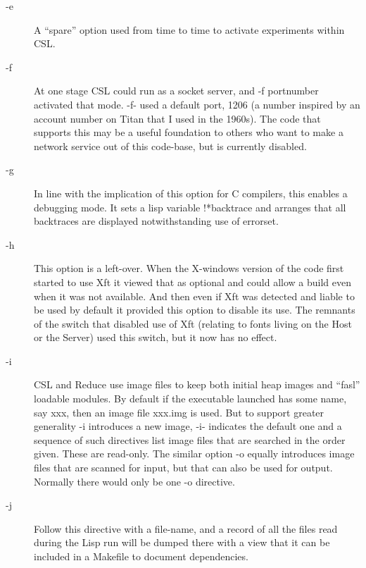 \documentclass[a4paper,11pt]{article}
\begin{document}
\begin{description}
\item [{\ttfamily -e}] 
A ``spare'' option used from time to time to activate experiments within
CSL.

\item [{\ttfamily -f}] 
At one stage CSL could run as a socket server, and {\ttfamily -f portnumber}
activated that mode. {\ttfamily -f-} used a default port, 1206 (a number
inspired by an account number on Titan that I used in the 1960s). The code
that supports this may be a useful foundation to others who want to make a
network service out of this code-base, but is currently disabled.

\item [{\ttfamily -g}] 
In line with the implication of this option for C compilers, this enables
a debugging mode. It sets a lisp variable {\ttfamily !*backtrace} and
arranges that all backtraces are displayed notwithstanding use of
{\ttfamily errorset}.

\item [{\ttfamily -h}] 
This option is a left-over. When the X-windows version of the code first
started to use Xft it viewed that as optional and could allow a build even when
it was not available. And then even if Xft was detected and liable to be used
by default it provided this option to disable its use. The remnants of the
switch that disabled use of Xft (relating to fonts living on the Host or
the Server) used this switch, but it now has no effect.

\item [{\ttfamily -i}] 
CSL and Reduce use image files to keep both initial heap images and
``fasl'' loadable modules. By default if the executable launched has some name,
say xxx, then an image file xxx.img is used. But to support greater
generality {\ttfamily -i} introduces a new image, {\ttfamily -i-} indicates
the default one and a sequence of such directives list image files that are
searched in the order given. These are read-only. The similar option
{\ttfamily -o} equally introduces image files that are scanned for input, but
that can also be used for output. Normally there would only be one
{\ttfamily -o} directive.

\item [{\ttfamily -j}] 
Follow this directive with a file-name, and a record of all the files read
during the Lisp run will be dumped there with a view that it can be included
in a Makefile to document dependencies.


\end{description}
\end{document}
